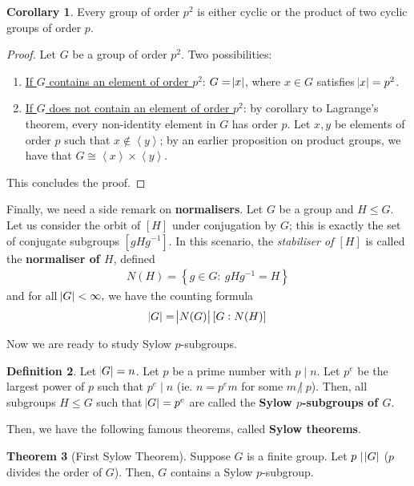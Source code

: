 \documentclass[11pt]{amsart} %
\theoremstyle{definition}
\newtheorem{definition}{Definition}[section]
\newtheorem{theorem}[definition]{Theorem}
\newtheorem{corollary}[definition]{Corollary}
\theoremstyle{definition}
\DeclareMathOperator{\notdiv}{\not|}
\numberwithin{equation}{section}
\newcommand{\condset}[4]{\left\{ #1  : \: #2 #3 #4 \right\}}
\newcommand{\cyclic}[1]{\left\langle #1 \right\rangle}
\begin{document}
\begin{corollary}
	\label{corgroupp2cyclicproduct}
	Every group of order $p^2$ is either cyclic or the product of two cyclic groups of order $p$.
\end{corollary}

\begin{proof}
	Let $G$ be a group of order $p^2$. Two possibilities:
	\begin{enumerate}
		\item \uline{If $G $ contains an element of order $p^2$}: $G = \abs{x}$, where $x \in G$ satisfies $\abs{x}=p^2$.
		\item \uline{If $G$ does not contain an element of order $p^2$}: by corollary to Lagrange's theorem, every non-identity element in $G$ has order $p$. Let $x,y $ be elements of order $p$ such that $x \notin \cyclic{y}$; by an earlier proposition on product groups, we have that $G \cong \cyclic{x} \times \cyclic{y}$.
	\end{enumerate}
	This concludes the proof.
\end{proof}

Finally, we need a side remark on \textbf{normalisers}. Let $G$ be a group and $H \leq G$. Let us consider the orbit of $[H]$ under conjugation by $G$; this is exactly the set of conjugate subgroups $[gHg^{-1}]$. In this scenario, the \textit{stabiliser of $ [H]$} is called the \textbf{normaliser of $H$}, defined
\begin{align}
\label{eqnormaliser}
N(H) = \condset{g\in G}{gHg^{-1}}{=}{H}
\end{align}
and for all $\abs{G} < \infty,$ we have the counting formula
\begin{align}
\label{eqcountingformula-normaliser}
\abs{G} = \abs{N(G)} [G:N(H)]
\end{align}

Now we are ready to study Sylow $p$-subgroups.

\begin{definition}
	\label{thmsylowpsubgroups}
	Let $\abs{G} = n$. Let $p $ be a prime number with $p \mid n$. Let $p^e$ be the largest power of $p$ such that $p^e \mid n$ (ie. $n = p^e m$ for some $m \notdiv p$). Then, all subgroups $H \leq G$ such that $\abs{G} = p^e$ are called the \textbf{Sylow $p$-subgroups of $G$}.
\end{definition}


Then, we have the following famous theorems, called \textbf{Sylow theorems}.

\begin{theorem}[First Sylow Theorem]
	\label{thmsylowfirst}
	Suppose $G$ is a finite group. Let $p \mid \abs{G}$ ($p$ divides the order of $G$). Then, $G$ contains a Sylow $p$-subgroup.
\end{theorem}
\end{document}
